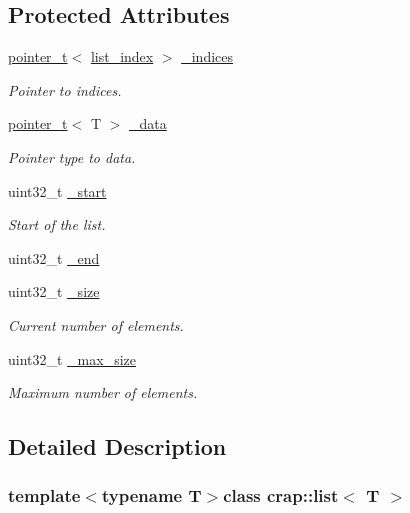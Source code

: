 \subsection*{Protected Attributes}
\begin{DoxyCompactItemize}
\item 
\hyperlink{structcrap_1_1pointer__t}{pointer\+\_\+t}$<$ \hyperlink{structcrap_1_1list_1_1list__index}{list\+\_\+index} $>$ \hyperlink{classcrap_1_1list_a2875e0226ccb2e4c5a74e33073bfdc6f}{\+\_\+indices}
\begin{DoxyCompactList}\small\item\em Pointer to indices. \end{DoxyCompactList}\item 
\hyperlink{structcrap_1_1pointer__t}{pointer\+\_\+t}$<$ T $>$ \hyperlink{classcrap_1_1list_af2d97cc0bbfc61a2c087c58e682b8336}{\+\_\+data}
\begin{DoxyCompactList}\small\item\em Pointer type to data. \end{DoxyCompactList}\item 
uint32\+\_\+t \hyperlink{classcrap_1_1list_a0bf2b54bd0906b835d8a4d18d41717ce}{\+\_\+start}
\begin{DoxyCompactList}\small\item\em Start of the list. \end{DoxyCompactList}\item 
uint32\+\_\+t \hyperlink{classcrap_1_1list_a787116724be64ac6cfd3dd47ea90f13c}{\+\_\+end}
\item 
uint32\+\_\+t \hyperlink{classcrap_1_1list_a8c38722c28fc087444acc484f7b0aa38}{\+\_\+size}
\begin{DoxyCompactList}\small\item\em Current number of elements. \end{DoxyCompactList}\item 
uint32\+\_\+t \hyperlink{classcrap_1_1list_ae71931f777bfb9dd77a8a4acfd0eb84c}{\+\_\+max\+\_\+size}
\begin{DoxyCompactList}\small\item\em Maximum number of elements. \end{DoxyCompactList}\end{DoxyCompactItemize}


\subsection{Detailed Description}
\subsubsection*{template$<$typename T$>$class crap\+::list$<$ T $>$}

